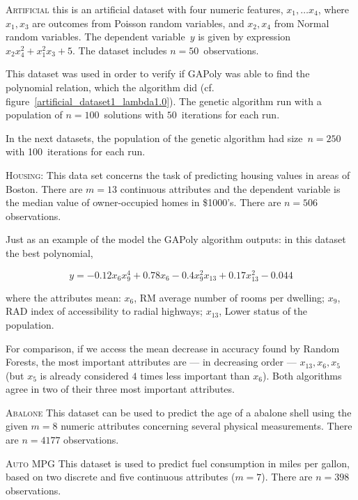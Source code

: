 \documentclass[preprint,authoryear,12pt]{elsarticle}
\begin{document}
\begin{description}
\item{\textsc{Artificial}} this is an artificial dataset with four numeric features, $x_1, \ldots x_4$, where $x_1,x_3$ are outcomes from Poisson random variables, and $x_2,x_4$ from Normal random variables. The dependent variable~$y$ is given by expression $x_2x_4^2 + x_1^2x_3 + 5$. The dataset includes $n=50$~observations.

This dataset was used in order to verify if \ac{GAPoly} was able to find the polynomial relation, which the algorithm did (cf. figure~\ref{artificial_dataset1_lambda1.0}). The genetic algorithm run with a population of $n=100$~solutions with $50$~iterations for each run.

In the next datasets, the population of the genetic algorithm had size~$n=250$ with 100~iterations for each run.

\item{\textsc{Housing}}: This data set concerns the task of predicting housing values in areas of Boston. There are $m=13$ continuous attributes and the dependent variable is the median value of owner-occupied homes in \$1000's. There are $n=506$ observations.

Just as an example of the model the \ac{GAPoly} algorithm outputs: in this dataset the best polynomial,

$$y = -0.12 x_6 x_9^4 + 0.78 x_6 - 0.4 x_9^2 x_{13} + 0.17 x_{13}^2 - 0.044$$

where the attributes mean:
$x_6$, RM average number of rooms per dwelling;
$x_9$, RAD index of accessibility to radial highways;
$x_{13}$, Lower status of the population.

For comparison, if we access the mean decrease in accuracy found by Random Forests, the most important attributes are --- in decreasing order --- $x_{13}, x_6, x_5$ (but $x_5$ is already considered $4$ times less important than $x_6$). Both algorithms agree in two of their three most important attributes.

\item{\textsc{Abalone}} This dataset can be used to predict the age of a abalone shell using the given $m=8$ numeric attributes concerning several physical measurements. There are $n=4177$ observations. 


\item{\textsc{Auto MPG}} This dataset is used to predict fuel consumption in miles per gallon, based on two discrete and five continuous attributes ($m=7$). There are $n=398$ observations.


\end{description}
\end{document}
